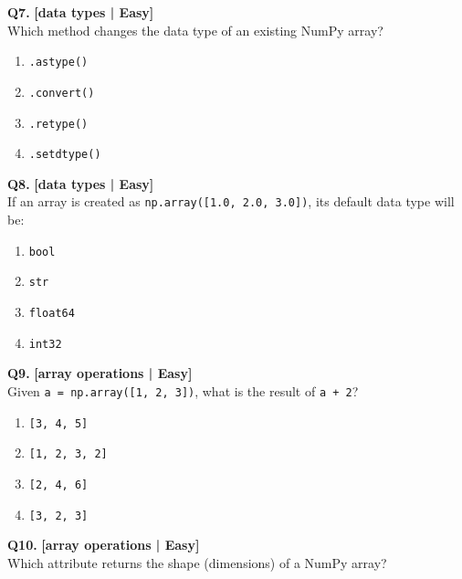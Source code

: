 \noindent\textbf{Q7.} \hfill {\small\color{LPUOrange}\textbf{[data types | Easy]}}\\[2pt]
Which method changes the data type of an existing NumPy array?

\begin{enumerate}[label=(\alph*),topsep=2pt,itemsep=1pt,partopsep=0pt,parsep=0pt]
    \item \relax \texttt{.astype()}
    \item \relax \texttt{.convert()}
    \item \relax \texttt{.retype()}
    \item \relax \texttt{.setdtype()}
\end{enumerate}
\vspace{2mm}

\noindent\textbf{Q8.} \hfill {\small\color{LPUOrange}\textbf{[data types | Easy]}}\\[2pt]
If an array is created as \texttt{np.array([1.0, 2.0, 3.0])}, its default data type will be:

\begin{enumerate}[label=(\alph*),topsep=2pt,itemsep=1pt,partopsep=0pt,parsep=0pt]
    \item \relax \texttt{bool}
    \item \relax \texttt{str}
    \item \relax \texttt{float64}
    \item \relax \texttt{int32}
\end{enumerate}
\vspace{2mm}

\noindent\textbf{Q9.} \hfill {\small\color{LPUOrange}\textbf{[array operations | Easy]}}\\[2pt]
Given \texttt{a = np.array([1, 2, 3])}, what is the result of \texttt{a + 2}?

\begin{enumerate}[label=(\alph*),topsep=2pt,itemsep=1pt,partopsep=0pt,parsep=0pt]
    \item \relax \texttt{[3, 4, 5]}
    \item \relax \texttt{[1, 2, 3, 2]}
    \item \relax \texttt{[2, 4, 6]}
    \item \relax \texttt{[3, 2, 3]}
\end{enumerate}
\vspace{2mm}

\noindent\textbf{Q10.} \hfill {\small\color{LPUOrange}\textbf{[array operations | Easy]}}\\[2pt]
Which attribute returns the shape (dimensions) of a NumPy array?

